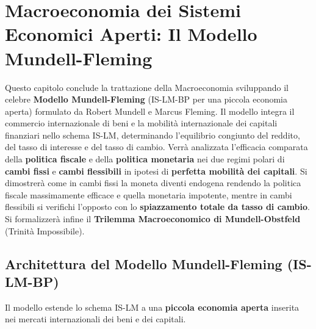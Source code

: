 \chapter{Macroeconomia dei Sistemi Economici Aperti: Il Modello Mundell-Fleming}
\label{chap:macroeconomia_sistemi_aperti}

\begin{tcolorbox}[colback=navyblue!5!white, colframe=navyblue, title=\textbf{Quadro Concettuale del Capitolo}]
Questo capitolo conclude la trattazione della Macroeconomia sviluppando il celebre \textbf{Modello Mundell-Fleming} (IS-LM-BP per una piccola economia aperta) formulato da Robert Mundell e Marcus Fleming. Il modello integra il commercio internazionale di beni e la mobilità internazionale dei capitali finanziari nello schema IS-LM, determinando l'equilibrio congiunto del reddito, del tasso di interesse e del tasso di cambio. Verrà analizzata l'efficacia comparata della \textbf{politica fiscale} e della \textbf{politica monetaria} nei due regimi polari di \textbf{cambi fissi} e \textbf{cambi flessibili} in ipotesi di \textbf{perfetta mobilità dei capitali}. Si dimostrerà come in cambi fissi la moneta diventi endogena rendendo la politica fiscale massimamente efficace e quella monetaria impotente, mentre in cambi flessibili si verifichi l'opposto con lo \textbf{spiazzamento totale da tasso di cambio}. Si formalizzerà infine il \textbf{Trilemma Macroeconomico di Mundell-Obstfeld} (Trinità Impossibile).
\end{tcolorbox}

\section{Architettura del Modello Mundell-Fleming (IS-LM-BP)}

Il modello estende lo schema IS-LM a una \textbf{piccola economia aperta} inserita nei mercati internazionali dei beni e dei capitali.

